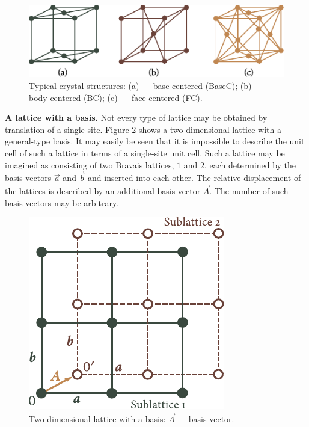 \begin{figure}[t]
	\begin{center}
		\includegraphics[scale=1]{figures/ch_01/fig_1_12.pdf}
		\caption[]{Typical crystal structures: (a) --- base-centered (BaseC); (b) --- body-centered (BC); (c) --- face-centered (FC).}
		\label{fig:1_12}
	\end{center}
	\vspace{-0.7cm}
\end{figure}

\textbf{A lattice with a basis.} Not every type of lattice may be obtained by translation of a single site. Figure \ref{fig:1_13} shows a two-dimensional lattice with a general-type basis. It may easily be seen that it is impossible to describe the unit cell of such a lattice in terms of a single-site unit cell. Such a lattice may be imagined as consisting of two Bravais lattices, $1$ and $2$, each determined by the basis vectors $\vec{a}$ and $\vec{b}$ and inserted into each other. The relative displacement of the lattices is described by an additional basis vector $\vec{A}$. The number of such basis vectors may be arbitrary.

\begin{figure}[t]
	\begin{center}
		\includegraphics[scale=0.95]{figures/ch_01/fig_1_13.pdf}
		\caption[]{Two-dimensional lattice with a basis: $\vec{A}$ --- basis vector.}
		\label{fig:1_13}
	\end{center}
	\vspace{-0.7cm}
\end{figure}

